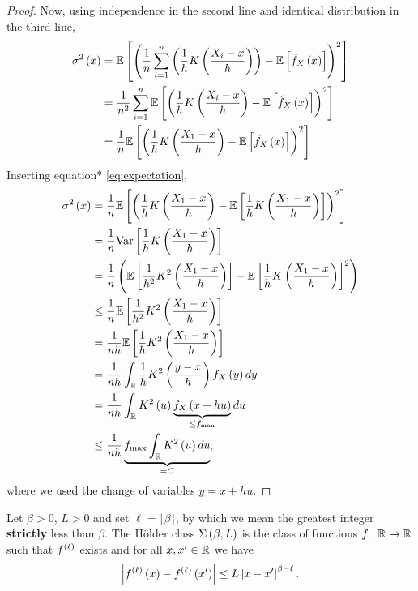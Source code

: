 \begin{proof}
  Now, using independence in the second line and identical distribution in the
  third line,
  \begin{equation*}
    \begin{split}
      \sigma^2\left(x\right) & = \mathbb{E}\left[\left(\frac{1}{n} \sum_{i=1}^n \left(\frac{1}{h} K\left(\frac{X_i-x}{h}\right)\right) - \mathbb{E}\left[\hat{f}_X \left(x\right)\right]\right)^2\right] \\
                     & =\frac{1}{n^2} \sum_{i=1}^n\mathbb{E}\left[ \left(\frac{1}{h} K\left(\frac{X_i-x}{h}\right) - \mathbb{E}\left[\hat{f}_X \left(x\right)\right]\right)^2\right]     \\
                     & = \frac{1}{n} \mathbb{E}\left[\left( \frac{1}{h} K\left(\frac{X_1-x}{h}\right)- \mathbb{E}\left[\hat{f}_X \left(x\right)\right]\right)^2\right]
    \end{split}
  \end{equation*}
  Inserting equation* \ref{eq:expectation},
  \begin{equation*}
    \begin{split}
      \sigma^2\left(x\right) & = \frac{1}{n} \mathbb{E}\left[\left( \frac{1}{h} K\left(\frac{X_1-x}{h}\right) - \mathbb{E}\left[\frac{1}{h} K\left(\frac{X_1-x}{h}\right)\right]\right)^2\right]     \\
                     & = \frac{1}{n}\mathrm{Var}\left[\frac{1}{h} K\left(\frac{X_1-x}{h}\right)\right]                                                        \\
                     & = \frac{1}{n}\left( \mathbb{E}\left[\frac{1}{h^2} K^2\left(\frac{X_1-x}{h}\right) \right] - \mathbb{E}\left[\frac{1}{h} K\left(\frac{X_1-x}{h}\right)\right]^2\right) \\
                     & \leq \frac{1}{n} \mathbb{E}\left[\frac{1}{h^2} K^2\left(\frac{X_1-x}{h}\right) \right]                                                 \\
                     & =\frac{1}{nh} \mathbb{E}\left[\frac{1}{h} K^2\left(\frac{X_1-x}{h}\right) \right]                                                      \\
                     & =\frac{1}{nh} \int_{\mathbb{R}} \frac{1}{h} K^2\left(\frac{y-x}{h}\right) f_X\left(y\right)dy                                             \\
                     & = \frac{1}{nh} \int_{\mathbb{R}} K^2\left(u\right) \underbrace{f_X\left(x+h u\right)}_{\leq f_{\max}} du                                  \\
                     & \leq \frac{1}{nh} \underbrace{f_{\max} \int_{\mathbb{R}} K^2\left(u\right) du}_{=C},
    \end{split}
  \end{equation*}
  where we used the change of variables $y=x+hu$.
\end{proof}

\begin{definition}
  Let $\beta>0$, $L>0$ and set $\ell = \lfloor \beta\rfloor$, by which we mean the greatest integer \textbf{strictly} less than $\beta$. The Hölder class $\Sigma \left(\beta,L\right)$ is the class of functions $f:\mathbb{R}\rightarrow \mathbb{R}$ such that $f^{\left(\ell\right)}$ exists and for all $x,x'\in \mathbb{R}$ we have
  \begin{equation*}
    \left| f^{\left(\ell\right)}\left(x\right)- f^{\left(\ell\right)}\left(x'\right)\right|\leq L\left| x-x'\right|^{\beta -\ell}.
  \end{equation*}
\end{definition}

